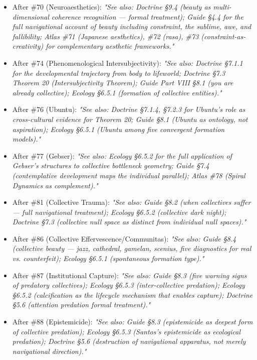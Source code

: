 \begin{itemize}[nosep,leftmargin=*]
  \item After \#70 (Neuroaesthetics): \textit{"See also: Doctrine §9.4 (beauty as multi-dimensional coherence recognition — formal treatment); Guide §4.4 for the full navigational account of beauty including constraint, the sublime, awe, and fallibility; Atlas \#71 (Japanese aesthetics), \#72 (rasa), \#73 (constraint-as-creativity) for complementary aesthetic frameworks."}
  \item After \#74 (Phenomenological Intersubjectivity): \textit{"See also: Doctrine §7.1.1 for the developmental trajectory from body to lifeworld; Doctrine §7.3 Theorem 20 (Intersubjectivity Theorem); Guide Part VIII §8.1 (you are already collective); Ecology §6.5.1 (formation of collective entities)."}
  \item After \#76 (Ubuntu): \textit{"See also: Doctrine §7.1.4, §7.2.3 for Ubuntu's role as cross-cultural evidence for Theorem 20; Guide §8.1 (Ubuntu as ontology, not aspiration); Ecology §6.5.1 (Ubuntu among five convergent formation models)."}
  \item After \#77 (Gebser): \textit{"See also: Ecology §6.5.2 for the full application of Gebser's structures to collective bottleneck geometry; Guide §7.4 (contemplative development maps the individual parallel); Atlas \#78 (Spiral Dynamics as complement)."}
  \item After \#81 (Collective Trauma): \textit{"See also: Guide §8.2 (when collectives suffer — full navigational treatment); Ecology §6.5.2 (collective dark night); Doctrine §7.3 (collective null space as distinct from individual null spaces)."}
  \item After \#86 (Collective Effervescence/Communitas): \textit{"See also: Guide §8.4 (collective beauty — jazz, cathedral, gamelan, scenius, five diagnostics for real vs. counterfeit); Ecology §6.5.1 (spontaneous formation type)."}
  \item After \#87 (Institutional Capture): \textit{"See also: Guide §8.3 (five warning signs of predatory collectives); Ecology §6.5.3 (inter-collective predation); Ecology §6.5.2 (calcification as the lifecycle mechanism that enables capture); Doctrine §5.6 (attention predation formal treatment)."}
  \item After \#88 (Epistemicide): \textit{"See also: Guide §8.3 (epistemicide as deepest form of collective predation); Ecology §6.5.3 (Santos's epistemicide as ecological predation); Doctrine §5.6 (destruction of navigational apparatus, not merely navigational direction)."}
\end{itemize}


